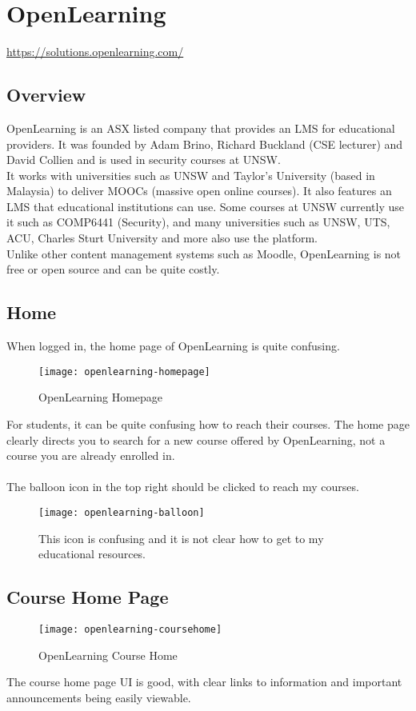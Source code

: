 
\section{OpenLearning}
\url{https://solutions.openlearning.com/}
\subsection{Overview}
OpenLearning is an ASX listed company that provides an LMS for educational providers. It was founded by Adam Brino, Richard Buckland (CSE lecturer) and David Collien and is used in security courses at UNSW\cite{openlearning}.\\
It works with universities such as UNSW and Taylor's University (based in Malaysia) to deliver MOOCs (massive open online courses). It also features an LMS that educational institutions can use. Some courses at UNSW currently use it such as COMP6441 (Security), and many universities such as UNSW, UTS, ACU, Charles Sturt University and more also use the platform.\\
Unlike other content management systems such as Moodle, OpenLearning is not free or open source and can be quite costly\cite{openlearningPricing}.\\

\subsection{Home}
When logged in, the home page of OpenLearning is quite confusing.\\
\begin{figure}[h!]
    \centering
    \texttt{[image: openlearning-homepage]}
    \caption{OpenLearning Homepage}
\end{figure}

For students, it can be quite confusing how to reach their courses. The home page clearly directs you to search for a new course offered by OpenLearning, not a course you are already enrolled in. \\
\\
The balloon icon in the top right should be clicked to reach my courses. \\
\begin{figure}[h!]
    \centering
    \texttt{[image: openlearning-balloon]}
    \caption{This icon is confusing and it is not clear how to get to my educational resources.}
\end{figure}

\subsection{Course Home Page}
\begin{figure}[h!]
    \centering
    \texttt{[image: openlearning-coursehome]}
    \caption{OpenLearning Course Home}
\end{figure}
The course home page UI is good, with clear links to information and important announcements being easily viewable.\\

